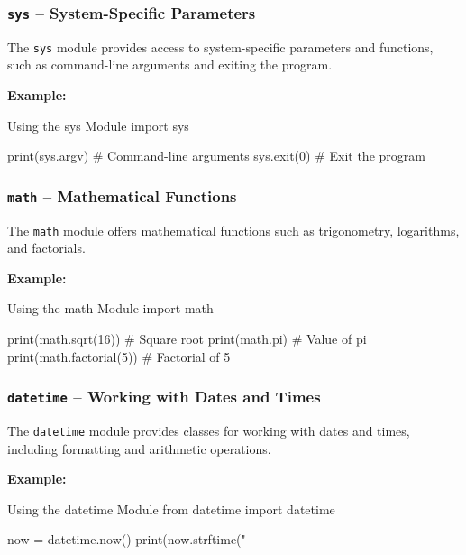 %
\subsubsection{\texttt{sys} – System-Specific Parameters}

The \texttt{sys} module provides access to system-specific parameters and functions, such as command-line arguments and exiting the program.

\textbf{Example:}
\begin{codeonly}{Using the sys Module}
import sys

print(sys.argv)  # Command-line arguments
sys.exit(0)  # Exit the program
\end{codeonly}

%
\subsubsection{\texttt{math} – Mathematical Functions}

The \texttt{math} module offers mathematical functions such as trigonometry, logarithms, and factorials.

\textbf{Example:}
\begin{codeonly}{Using the math Module}
import math

print(math.sqrt(16))  # Square root
print(math.pi)  # Value of pi
print(math.factorial(5))  # Factorial of 5
\end{codeonly}

%
\subsubsection{\texttt{datetime} – Working with Dates and Times}

The \texttt{datetime} module provides classes for working with dates and times, including formatting and arithmetic operations.

\textbf{Example:}
\begin{codeonly}{Using the datetime Module}
from datetime import datetime

now = datetime.now()
print(now.strftime("%
\end{codeonly}

